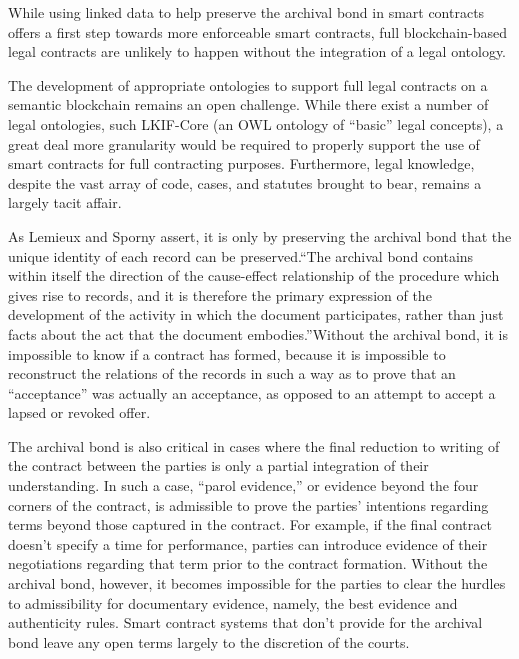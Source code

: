 	      While using linked data to help preserve the archival bond
	      in smart contracts offers a first step towards more enforceable
	      smart contracts, full blockchain-based legal contracts are
	      unlikely to happen without the integration of a legal ontology.
	      
	      The development of appropriate ontologies to support
	      full legal contracts on a semantic blockchain remains an open
	      challenge. While there exist a number of legal ontologies,
	      such LKIF-Core (an OWL ontology of “basic” legal
	      concepts), a great deal more granularity would be required to
	      properly support the use of smart contracts for full contracting
	      purposes. Furthermore, legal knowledge, despite the vast array
	      of code, cases, and statutes brought to bear, remains a largely
	      tacit affair.
	      
	      As Lemieux and Sporny assert, it is only by preserving the
	      archival bond that the unique identity of each record can be
	      preserved.“The archival bond contains within itself the
	      direction of the cause-effect relationship of the procedure
	      which gives rise to records, and it is therefore the primary
	      expression of the development of the activity in which the
	      document participates, rather than just facts about the act that
	      the document embodies.”Without the archival bond, it is
	      impossible to know if a contract has formed, because it is
	      impossible to reconstruct the relations of the records in such a
	      way as to prove that an “acceptance” was actually an
	      acceptance, as opposed to an attempt to accept a lapsed or
	      revoked offer. 
	      
	      The archival bond is also critical in cases where the
	      final reduction to writing of the contract between the parties is
	      only a partial integration of their understanding. In such a
	      case, “parol evidence,” or evidence beyond the four corners of
	      the contract, is admissible to prove the parties’ intentions
	      regarding terms beyond those captured in the contract. For
	      example, if the final contract doesn’t specify a time for
	      performance, parties can introduce evidence of their
	      negotiations regarding that term prior to the contract
	      formation. Without the archival bond, however, it becomes
	      impossible for the parties to clear the hurdles to admissibility
	      for documentary evidence, namely, the best evidence and
	      authenticity rules. Smart contract systems that don’t provide
	      for the archival bond leave any open terms largely to the
	      discretion of the courts.  
